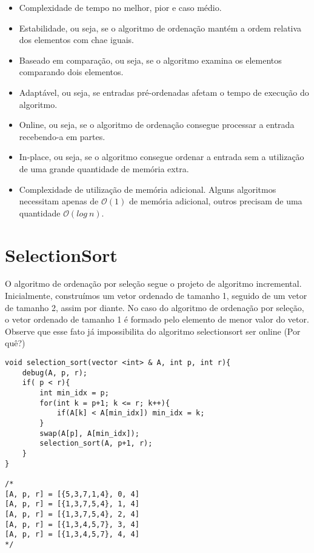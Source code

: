\begin{itemize}
    \item Complexidade de tempo no melhor, pior e caso médio. 
    \item Estabilidade, ou seja, se o algoritmo de ordenação mantém a ordem relativa dos elementos com chae iguais.
    \item Baseado em comparação, ou seja, se o algoritmo examina os elementos comparando dois elementos.
    \item Adaptável, ou seja, se entradas pré-ordenadas afetam o tempo de execução do algoritmo.
    \item Online, ou seja, se o algoritmo de ordenação consegue processar a entrada recebendo-a em partes.
    \item In-place, ou seja, se o algoritmo consegue ordenar a entrada sem a utilização de uma grande quantidade de memória extra. 
    \item Complexidade de utilização de memória adicional. Alguns algoritmos necessitam apenas de $\mathcal{O}(1)$ de memória adicional, outros precisam de uma quantidade $\mathcal{O}(log~n)$.
\end{itemize}



\section{SelectionSort}

O algoritmo de ordenação por seleção segue o projeto de algoritmo incremental. Inicialmente, construímos um vetor ordenado de tamanho 1, seguido de um vetor de tamanho 2, assim por diante. No caso do algoritmo de ordenação por seleção, o vetor ordenado de tamanho 1 é formado pelo elemento de menor valor do vetor. Observe que esse fato já impossibilita do algoritmo selectionsort ser online (Por quê?)

\begin{verbatim}
void selection_sort(vector <int> & A, int p, int r){
    debug(A, p, r);
    if( p < r){
        int min_idx = p;
        for(int k = p+1; k <= r; k++){
            if(A[k] < A[min_idx]) min_idx = k;
        }
        swap(A[p], A[min_idx]);
        selection_sort(A, p+1, r);
    }
}

/*
[A, p, r] = [{5,3,7,1,4}, 0, 4]
[A, p, r] = [{1,3,7,5,4}, 1, 4]
[A, p, r] = [{1,3,7,5,4}, 2, 4]
[A, p, r] = [{1,3,4,5,7}, 3, 4]
[A, p, r] = [{1,3,4,5,7}, 4, 4]
*/

\end{verbatim}

